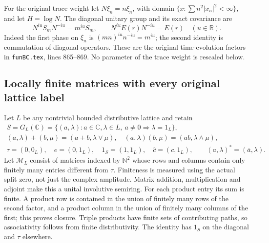 For the original trace weight let $N\xi_n=n\xi_n$, with
domain $\{x:\sum n^2|x_n|^2<\infty\}$, and let
$H=\log N$. The diagonal unitary group and its exact covariance
are
\begin{equation}\tag{HCR6}
 N^{iu}S_mN^{-iu}=m^{iu}S_m,\qquad
 N^{iu}E(r)N^{-iu}=E(r)\quad(u\in\mathbb R).
\end{equation}
Indeed the first phase on $\xi_n$ is $(mn)^{iu}n^{-iu}=m^{iu}$;
the second identity is commutation of diagonal operators.
These are the original time-evolution factors in
\nolinkurl{funBC.tex}, lines 865--869. No parameter of the trace
weight is rescaled below.

\subsection{Locally finite matrices with every original lattice label}

Let $L$ be any nontrivial bounded distributive lattice and retain
\begin{equation}\tag{HCR7}
\begin{gathered}
 S=G_L(\mathbb C)=\{(a,\lambda):a\in\mathbb C,\lambda\in L,
                               \ a\ne0\Rightarrow\lambda=1_L\},\\
 (a,\lambda)+(b,\mu)=(a+b,\lambda\vee\mu),\quad
 (a,\lambda)(b,\mu)=(ab,\lambda\wedge\mu),\\
 \tau=(0,0_L),\quad e=(0,1_L),\quad 1_S=(1,1_L),\quad
 \widehat c=(c,1_L),\qquad(a,\lambda)^*=(\overline a,\lambda).
\end{gathered}
\end{equation}
Let $\mathscr M_L$ consist of matrices indexed by $\mathbb N^2$
whose rows and columns contain only finitely many entries different
from $\tau$. Finiteness is measured using the actual split zero,
not just the complex amplitude. Matrix addition, multiplication
and adjoint make this a unital involutive semiring. For each
product entry its sum is finite. A product row is contained in
the union of finitely many rows of the second factor, and a
product column in the union of finitely many columns of the
first; this proves closure. Triple products have finite sets
of contributing paths, so associativity follows from finite
distributivity. The identity has $1_S$ on the diagonal and
$\tau$ elsewhere.


